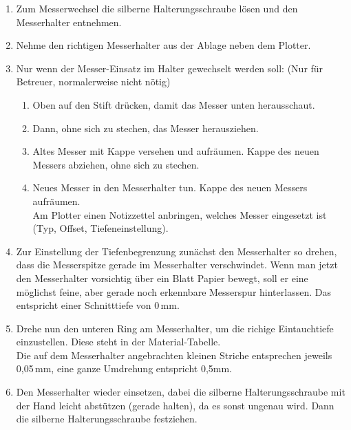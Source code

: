 \documentclass{\basedir/fablab-document}
\begin{document}
\begin{enumerate}
 \item Zum Messerwechsel die silberne Halterungsschraube lösen und den Messerhalter entnehmen.
 \item Nehme den richtigen Messerhalter aus der Ablage neben dem Plotter.
 \item Nur wenn der Messer-Einsatz im Halter gewechselt werden soll: (Nur für Betreuer, normalerweise nicht nötig)
    \begin{enumerate}
    \item Oben auf den Stift drücken, damit das Messer unten herausschaut. 
    \item Dann, ohne sich zu stechen, das Messer herausziehen. 
    \item Altes Messer mit Kappe versehen und aufräumen. Kappe des neuen Messers abziehen, ohne sich zu stechen.
    \item Neues Messer in den Messerhalter tun. Kappe des neuen Messers aufräumen.\\ Am Plotter einen Notizzettel anbringen, welches Messer eingesetzt ist (Typ, Offset, Tiefeneinstellung).
    \end{enumerate}
\item Zur Einstellung der Tiefenbegrenzung zunächst den Messerhalter so drehen, dass die Messerspitze gerade im Messerhalter verschwindet. Wenn man jetzt den Messerhalter vorsichtig über ein Blatt Papier bewegt, soll er eine möglichst feine, aber gerade noch erkennbare Messerspur hinterlassen. Das entspricht einer Schnitttiefe von 0\,mm. 
\item Drehe nun den unteren Ring am Messerhalter, um die richige Eintauchtiefe einzustellen. Diese steht in der Material-Tabelle. \\Die auf dem Messerhalter angebrachten kleinen Striche entsprechen jeweils 0,05\,mm, eine ganze Umdrehung entspricht 0,5mm.

\item Den Messerhalter wieder einsetzen, dabei die silberne Halterungsschraube mit der Hand leicht abstützen (gerade halten), da es sonst ungenau wird. Dann die silberne Halterungsschraube festziehen.
\end{enumerate}
\end{document}
